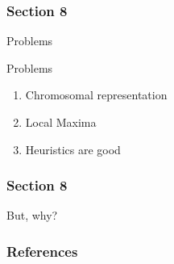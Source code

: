 \documentclass[18pt]{beamer}
\begin{document}
    \begin{centering}
        \begin{frame}[c]{}
            \frametitle{Section 8}
            Problems
        \end{frame}
    \end{centering}

    \begin{frame}{Problems}
        \begin{enumerate}
            \item Chromosomal representation
            \item Local Maxima
            \item Heuristics are good
        \end{enumerate}
    \end{frame}

    \begin{centering}
        \begin{frame}[c]{}
            \frametitle{Section 8}
            But, why?
        \end{frame}
    \end{centering}

    \begin{frame}[allowframebreaks]
            \frametitle{References}
            
            
    \end{frame}
\end{document}
